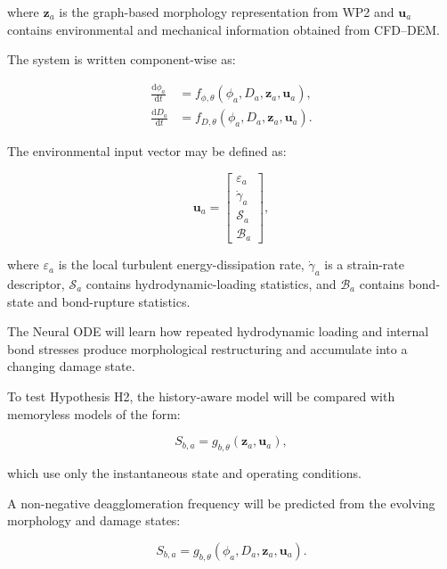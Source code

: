 \documentclass[11pt,a4paper,twoside]{scrartcl}
\begin{document}
where $\mathbf{z}_a$ is the graph-based morphology representation from WP2 and $\mathbf{u}_a$ contains environmental and mechanical information obtained from CFD--DEM.

The system is written component-wise as:

\begin{equation}
	\begin{aligned}
		\frac{\mathrm{d}\phi_a}{\mathrm{d}t}
		&=
		f_{\phi,\theta}
		\left(
		\phi_a,
		D_a,
		\mathbf{z}_a,
		\mathbf{u}_a
		\right), \\
		\frac{\mathrm{d}D_a}{\mathrm{d}t}
		&=
		f_{D,\theta}
		\left(
		\phi_a,
		D_a,
		\mathbf{z}_a,
		\mathbf{u}_a
		\right).
	\end{aligned}
\end{equation}

The environmental input vector may be defined as:

\begin{equation}
	\mathbf{u}_a
	=
	\begin{bmatrix}
		\varepsilon_a \\
		\dot{\gamma}_a \\
		\mathcal{S}_a \\
		\mathcal{B}_a
	\end{bmatrix},
\end{equation}

where $\varepsilon_a$ is the local turbulent energy-dissipation rate, $\dot{\gamma}_a$ is a strain-rate descriptor, $\mathcal{S}_a$ contains hydrodynamic-loading statistics, and $\mathcal{B}_a$ contains bond-state and bond-rupture statistics.

The Neural ODE will learn how repeated hydrodynamic loading and internal bond stresses produce morphological restructuring and accumulate into a changing damage state.

To test Hypothesis H2, the history-aware model will be compared with memoryless models of the form:

\begin{equation}
	S_{b,a}
	=
	g_{b,\theta}
	\left(
	\mathbf{z}_a,
	\mathbf{u}_a
	\right),
\end{equation}

which use only the instantaneous state and operating conditions.

A non-negative deagglomeration frequency will be predicted from the evolving morphology and damage states:

\begin{equation}
	S_{b,a}
	=
	g_{b,\theta}
	\left(
	\phi_a,
	D_a,
	\mathbf{z}_a,
	\mathbf{u}_a
	\right).
\end{equation}
\end{document}
